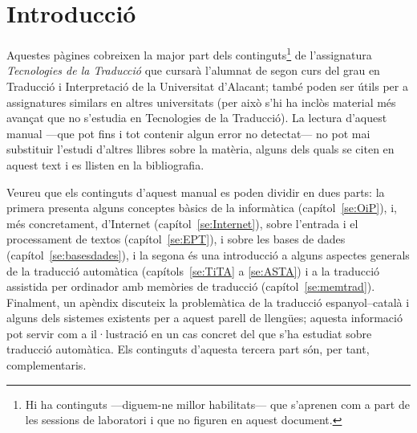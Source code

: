 \chapter{Introducció}

Aquestes pàgines cobreixen la major part dels continguts\footnote{Hi ha
  continguts ---diguem-ne millor habilitats--- que s'aprenen com a
  part de les sessions de laboratori i que no figuren en aquest
  document.} de l'assignatura \emph{Tecnologies de la Traducció} que
cursarà l'alumnat de segon curs del grau en Traducció i Interpretació
de la Universitat d'Alacant; també poden ser útils per a assignatures
similars en altres universitats (per això s'hi ha inclòs material més
avançat que no s'estudia en Tecnologies de la Traducció).  La lectura
d'aquest manual ---que pot fins i tot contenir algun error no
detectat--- no pot mai substituir l'estudi d'altres llibres sobre la
matèria, alguns dels quals se citen en aquest text i es llisten en la
bibliografia.
  
Veureu que els continguts d'aquest manual es poden dividir en dues
parts: la primera presenta alguns conceptes bàsics de la informàtica
(capítol~\ref{se:OiP}), i, més concretament, d'Internet
(capítol~\ref{se:Internet}), sobre l'entrada i el processament de
textos (capítol~\ref{se:EPT}), i sobre les bases de dades
(capítol~\ref{se:basesdades}), i la segona és una introducció a alguns
aspectes generals de la traducció automàtica (capítols~\ref{se:TiTA} a
\ref{se:ASTA}) i a la traducció assistida per ordinador amb memòries
de traducció (capítol~\ref{se:memtrad}). Finalment, un apèndix
discuteix la problemàtica de la traducció espanyol--català i alguns
dels sistemes existents per a aquest parell de llengües; aquesta informació pot servir com a
il·lustració en un cas concret del que s'ha estudiat sobre traducció
automàtica. Els continguts d'aquesta tercera part són, per tant,
complementaris.
  
